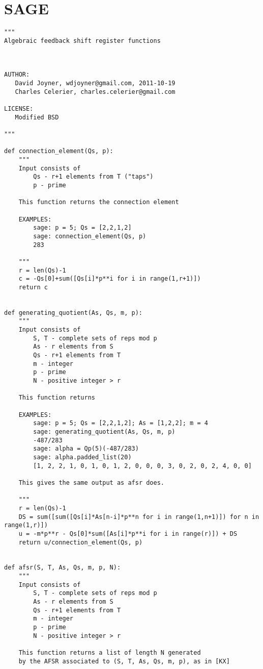 \section{SAGE}
\begin{verbatim}
"""
Algebraic feedback shift register functions



AUTHOR:
   David Joyner, wdjoyner@gmail.com, 2011-10-19
   Charles Celerier, charles.celerier@gmail.com

LICENSE:
   Modified BSD

"""

def connection_element(Qs, p):
    """
    Input consists of 
        Qs - r+1 elements from T ("taps")
        p - prime

    This function returns the connection element

    EXAMPLES:
        sage: p = 5; Qs = [2,2,1,2]
        sage: connection_element(Qs, p)
        283

    """
    r = len(Qs)-1
    c = -Qs[0]+sum([Qs[i]*p**i for i in range(1,r+1)])
    return c


def generating_quotient(As, Qs, m, p):
    """
    Input consists of 
        S, T - complete sets of reps mod p
        As - r elements from S
        Qs - r+1 elements from T
        m - integer
        p - prime
        N - positive integer > r

    This function returns

    EXAMPLES:
        sage: p = 5; Qs = [2,2,1,2]; As = [1,2,2]; m = 4
        sage: generating_quotient(As, Qs, m, p)
        -487/283
        sage: alpha = Qp(5)(-487/283)
        sage: alpha.padded_list(20)
        [1, 2, 2, 1, 0, 1, 0, 1, 2, 0, 0, 0, 3, 0, 2, 0, 2, 4, 0, 0]

    This gives the same output as afsr does.

    """
    r = len(Qs)-1
    DS = sum([sum([Qs[i]*As[n-i]*p**n for i in range(1,n+1)]) for n in range(1,r)])
    u = -m*p**r - Qs[0]*sum([As[i]*p**i for i in range(r)]) + DS
    return u/connection_element(Qs, p)


def afsr(S, T, As, Qs, m, p, N):
    """
    Input consists of 
        S, T - complete sets of reps mod p
        As - r elements from S
        Qs - r+1 elements from T
        m - integer
        p - prime
        N - positive integer > r

    This function returns a list of length N generated
    by the AFSR associated to (S, T, As, Qs, m, p), as in [KX]
  

\end{verbatim}
